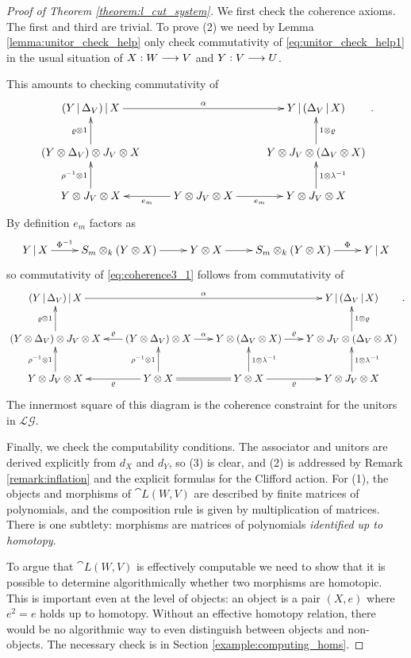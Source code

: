 \documentclass[english,letter paper,12pt,leqno]{article}
\theoremstyle{example}
\numberwithin{equation}{section}
\def\LG{\mathcal{LG}}
\begin{document}
\begin{proof}[Proof of Theorem \ref{theorem:l_cut_system}] We first check the coherence axioms. The first and third are trivial. To prove (2) we need by Lemma \ref{lemma:unitor_check_help} only check commutativity of \eqref{eq:unitor_check_help1} in the usual situation of $X: W \longrightarrow V$ and $Y: V \longrightarrow U$. 

This amounts to checking commutativity of
\begin{equation}\label{eq:coherence3_1}
\xymatrix{
(Y \l \Delta_V ) \l X \ar[rr]^-{\alpha} & & Y \l ( \Delta_V \l X )\\
(Y \otimes \Delta_V) \otimes J_V \otimes X \ar[u]^-{\varrho \otimes 1} & & Y \otimes J_V \otimes ( \Delta_V \otimes X) \ar[u]_-{1 \otimes \varrho}\\
Y \otimes J_V \otimes X \ar[u]^-{ \rho^{-1} \otimes 1} & Y \otimes J_V \otimes X \ar[l]^-{e_m} \ar[r]_-{e_m} & Y \otimes J_V \otimes X \ar[u]_-{1 \otimes \lambda^{-1}}
}\,.
\end{equation}
By definition $e_m$ factors as
\[
\xymatrix{
Y \l X \ar[r]^-{\Phi^{-1}} & S_m \otimes_k ( Y \otimes X ) \ar[r] & Y \otimes X \ar[r] & S_m \otimes_k (Y \otimes X) \ar[r]^-{\Phi} & Y \l X
}
\]
so commutativity of \eqref{eq:coherence3_1} follows from commutativity of
\[
\xymatrix@C-0.5pc{
(Y \l \Delta_V ) \l X \ar[rrr]^-{\alpha} & & & Y \l ( \Delta_V \l X )\\
(Y \otimes \Delta_V) \otimes J_V \otimes X \ar[u]^-{\varrho \otimes 1} & (Y \otimes \Delta_V ) \otimes X \ar[l]_-{\varrho} \ar[r]^-{\alpha} & Y \otimes (\Delta_V \otimes X) \ar[r]^-{\varrho} & Y \otimes J_V \otimes ( \Delta_V \otimes X) \ar[u]_-{1 \otimes \varrho}\\
Y \otimes J_V \otimes X \ar[u]^-{ \rho^{-1} \otimes 1} & Y \otimes X \ar[u]^-{\rho^{-1} \otimes 1} \ar@{=}[r] \ar[l]^-{\varrho} & Y \otimes X \ar[u]_-{1 \otimes \lambda^{-1}} \ar[r]_-{\varrho} & Y \otimes J_V \otimes X \ar[u]_-{1 \otimes \lambda^{-1}}
}\,.
\]
The innermost square of this diagram is the coherence constraint for the unitors in $\LG$.

Finally, we check the computability conditions. The associator and unitors are derived explicitly from $d_X$ and $d_Y$, so (3) is clear, and (2) is addressed by Remark \ref{remark:inflation} and the explicit formulas for the Clifford action. For (1), the objects and morphisms of $\cat{L}(W,V)$ are described by finite matrices of polynomials, and the composition rule is given by multiplication of matrices. There is one subtlety: morphisms are matrices of polynomials \emph{identified up to homotopy}. 

To argue that $\cat{L}(W,V)$ is effectively computable we need to show that it is possible to determine algorithmically whether two morphisms are homotopic. This is important even at the level of objects: an object is a pair $(X,e)$ where $e^2 = e$ holds up to homotopy. Without an effective homotopy relation, there would be no algorithmic way to even distinguish between objects and non-objects. The necessary check is in Section \ref{example:computing_homs}.
\end{proof}
\end{document}
